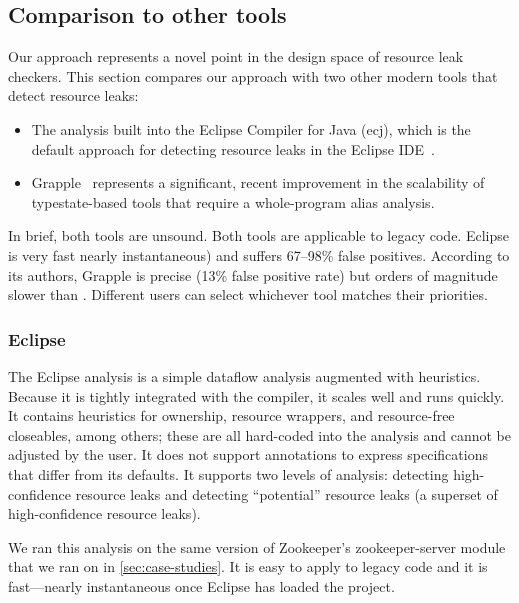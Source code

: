 \subsection{Comparison to other tools}
\label{sec:compare}

Our approach represents a novel point in the design space of resource leak checkers.
%
This section compares our approach with two other modern tools that detect resource leaks:
\begin{itemize}
\item The analysis built into the Eclipse Compiler for Java (ecj), which is the default approach
  for detecting resource leaks in the Eclipse IDE~\cite{ecj-resource-leak}.
\item Grapple~\cite{zuo2019grapple} represents a significant, recent
  improvement in the scalability of typestate-based tools that require a whole-program alias analysis.
\end{itemize}
In brief, both tools are unsound.
Both tools are applicable to legacy code. %
Eclipse is very fast nearly instantaneous) and suffers 67--98\% false
positives. %
According to its authors, Grapple is precise (13\% false positive rate) but orders
of magnitude slower than \Tool.
Different users can select whichever tool matches
their priorities.


\subsubsection{Eclipse}
\label{sec:eclipse}

The Eclipse analysis is a simple dataflow analysis
augmented with heuristics. Because it is tightly integrated with
the compiler, it scales well and runs quickly. It contains
heuristics for ownership, resource wrappers, and resource-free
closeables, among others; these are all hard-coded into the analysis and cannot
be adjusted by the user. It does not support annotations to express
specifications that differ from its defaults.
It supports two levels of analysis: detecting high-confidence resource
leaks and detecting ``potential'' resource
leaks (a superset of high-confidence resource leaks).

We ran this analysis on the same version of Zookeeper's zookeeper-server
module that we ran \Tool on in \cref{sec:case-studies}. It is easy to apply
to legacy code and it is fast---nearly instantaneous once Eclipse
has loaded the project.


